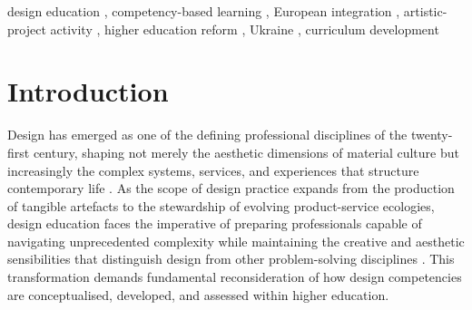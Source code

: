 \documentclass[ed]{acnsart}
\begin{document}
\begin{abstract}
pedagogically sound approaches to artistic-project training, and strategic engagement with European integration mechanisms. The framework offers implications for design educators, curriculum developers, and policymakers in Ukraine and other countries navigating similar integration trajectories. Future research directions include empirical validation of the proposed model and comparative studies across post-Soviet design education systems.
	\end{abstract}
	
	\begin{keywords}
		design education \sep
		competency-based learning \sep
		European integration \sep
		artistic-project activity \sep
		higher education reform \sep
		Ukraine \sep
		curriculum development
	\end{keywords}
	
	
	\maketitle
	
	
	\section{Introduction}
	
	Design has emerged as one of the defining professional disciplines of the twenty-first century, shaping not merely the aesthetic dimensions of material culture but increasingly the complex systems, services, and experiences that structure contemporary life \cite{Davis202397}. As the scope of design practice expands from the production of tangible artefacts to the stewardship of evolving product-service ecologies, design education faces the imperative of preparing professionals capable of navigating unprecedented complexity while maintaining the creative and aesthetic sensibilities that distinguish design from other problem-solving disciplines \cite{Maia2022105}. This transformation demands fundamental reconsideration of how design competencies are conceptualised, developed, and assessed within higher education.
	
\end{document}
